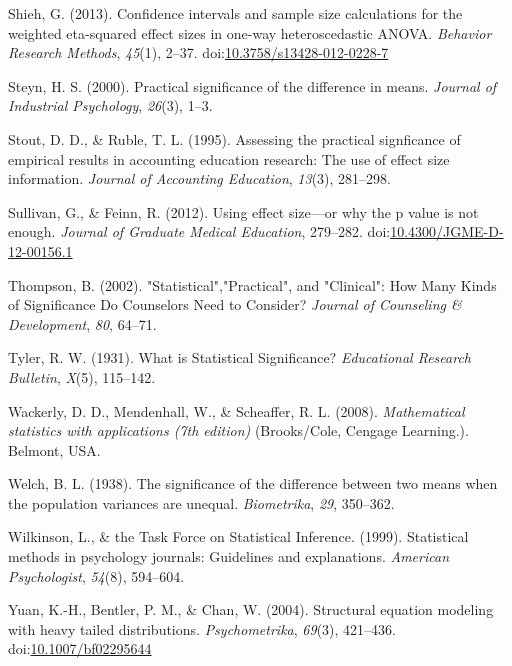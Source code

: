 \documentclass[
  man,floatsintext]{apa6}
\begin{document}
\leavevmode\hypertarget{ref-Shieh_2013}{}%
Shieh, G. (2013). Confidence intervals and sample size calculations for the weighted eta-squared effect sizes in one-way heteroscedastic ANOVA. \emph{Behavior Research Methods}, \emph{45}(1), 2--37. doi:\href{https://doi.org/10.3758/s13428-012-0228-7}{10.3758/s13428-012-0228-7}

\leavevmode\hypertarget{ref-Steyn_2000}{}%
Steyn, H. S. (2000). Practical significance of the difference in means. \emph{Journal of Industrial Psychology}, \emph{26}(3), 1--3.

\leavevmode\hypertarget{ref-Stout_Ruble_1995}{}%
Stout, D. D., \& Ruble, T. L. (1995). Assessing the practical signficance of empirical results in accounting education research: The use of effect size information. \emph{Journal of Accounting Education}, \emph{13}(3), 281--298.

\leavevmode\hypertarget{ref-Sullivan_Feinn_2012}{}%
Sullivan, G., \& Feinn, R. (2012). Using effect size---or why the p value is not enough. \emph{Journal of Graduate Medical Education}, 279--282. doi:\href{https://doi.org/10.4300/JGME-D-12-00156.1}{10.4300/JGME-D-12-00156.1}

\leavevmode\hypertarget{ref-Thompson_2002}{}%
Thompson, B. (2002). "Statistical","Practical", and "Clinical": How Many Kinds of Significance Do Counselors Need to Consider? \emph{Journal of Counseling \& Development}, \emph{80}, 64--71.

\leavevmode\hypertarget{ref-Tyler_1931}{}%
Tyler, R. W. (1931). What is Statistical Significance? \emph{Educational Research Bulletin}, \emph{X}(5), 115--142.

\leavevmode\hypertarget{ref-Wackerly_et_al_2008}{}%
Wackerly, D. D., Mendenhall, W., \& Scheaffer, R. L. (2008). \emph{Mathematical statistics with applications (7th edition)} (Brooks/Cole, Cengage Learning.). Belmont, USA.

\leavevmode\hypertarget{ref-Welch_1938}{}%
Welch, B. L. (1938). The significance of the difference between two means when the population variances are unequal. \emph{Biometrika}, \emph{29}, 350--362.

\leavevmode\hypertarget{ref-Wilkinson_1999}{}%
Wilkinson, L., \& the Task Force on Statistical Inference. (1999). Statistical methods in psychology journals: Guidelines and explanations. \emph{American Psychologist}, \emph{54}(8), 594--604.

\leavevmode\hypertarget{ref-Yuan_et_al_2004}{}%
Yuan, K.-H., Bentler, P. M., \& Chan, W. (2004). Structural equation modeling with heavy tailed distributions. \emph{Psychometrika}, \emph{69}(3), 421--436. doi:\href{https://doi.org/10.1007/bf02295644}{10.1007/bf02295644}
\end{document}
